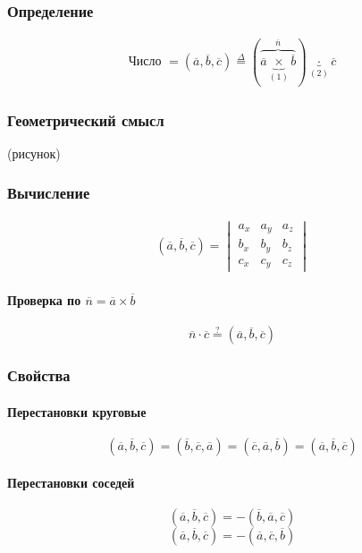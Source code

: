 \documentclass{article}
\begin{document}
\subsubsection{Определение}
\begin{gather*}
    \text{Число } = (\overline{a}, \overline{b}, \overline{c}) \overset{\Delta}{=}
    (\overbrace{\overline{a} \underbrace{\times}_{(1)} \overline{b}}^{\overline{n}}) \underbrace{\cdot}_{(2)} \overline{c}
\end{gather*}

\subsubsection{Геометрический смысл}
(рисунок)

\subsubsection{Вычисление}
\begin{gather*}
    (\overline{a}, \overline{b}, \overline{c}) =
    \begin{vmatrix}
        a_x & a_y & a_z \\
        b_x & b_y & b_z \\
        c_x & c_y & c_z
    \end{vmatrix}
\end{gather*}
\paragraph{Проверка по $\overline{n} = \overline{a} \times \overline{b}$}
\[
    \overline{n} \cdot \overline{c} \overset{?}{=} (\overline{a}, \overline{b}, \overline{c})
\]


\subsubsection{Свойства}

\paragraph{Перестановки круговые}
\[
    (\overline{a}, \overline{b}, \overline{c}) =
    (\overline{b}, \overline{c}, \overline{a}) =
    (\overline{c}, \overline{a}, \overline{b}) =
    (\overline{a}, \overline{b}, \overline{c})
\]

\paragraph{Перестановки соседей}
\[
     (\overline{a}, \overline{b}, \overline{c}) =
    -(\overline{b}, \overline{a}, \overline{c})
\]
\[
     (\overline{a}, \overline{b}, \overline{c}) =
    -(\overline{a}, \overline{c}, \overline{b})
\]
\end{document}
